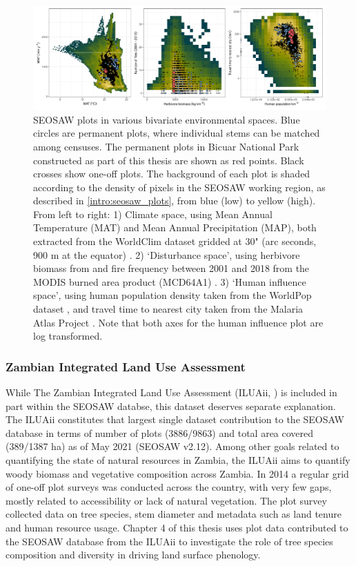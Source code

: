 \begin{refsection}
\begin{figure}[tb]
\centering
	\includegraphics[width=\textwidth]{img/seosaw_space_all}
	\caption[Distribution of SEOSAW plots in environmental space]{SEOSAW plots in various bivariate environmental spaces. Blue circles are permanent plots, where individual stems can be matched among censuses. The permanent plots in Bicuar National Park constructed as part of this thesis are shown as red points. Black crosses show one-off plots. The background of each plot is shaded according to the density of pixels in the SEOSAW working region, as described in \autoref{intro:seosaw_plots}, from blue (low) to yellow (high). From left to right: 1) Climate space, using Mean Annual Temperature (MAT) and Mean Annual Precipitation (MAP), both extracted from the WorldClim dataset gridded at 30" (arc seconds, \textapprox{}900 m at the equator) \citep{Fick2017}. 2) `Disturbance space', using herbivore biomass from \citet{Hempson2017} and fire frequency between 2001 and 2018 from the MODIS burned area product (MCD64A1) \citep{MCD64A1}. 3) `Human influence space', using human population density taken from the WorldPop dataset \citep{Linard2012}, and travel time to nearest city taken from the Malaria Atlas Project \citep{Meijer2018}. Note that both axes for the human influence plot are log transformed.}
	\label{intro:seosaw_space_all}
\end{figure}

\subsubsection{Zambian Integrated Land Use Assessment}
\label{intro:sssec:iluaii}

While The Zambian Integrated Land Use Assessment (ILUAii, \citealt{Mukosha2009}) is included in part within the SEOSAW databse, this dataset deserves separate explanation. The ILUAii constitutes that largest single dataset contribution to the SEOSAW database in terms of number of plots (3886/9863) and total area covered (389/1387 ha) as of May 2021 (SEOSAW v2.12). Among other goals related to quantifying the state of natural resources in Zambia, the ILUAii aims to quantify woody biomass and vegetative composition across Zambia. In 2014 a regular grid of one-off plot surveys was conducted across the country, with very few gaps, mostly related to accessibility or lack of natural vegetation. The plot survey collected data on tree species, stem diameter and metadata such as land tenure and human resource usage. Chapter 4 of this thesis uses plot data contributed to the SEOSAW database from the ILUAii to investigate the role of tree species composition and diversity in driving land surface phenology. 


\end{refsection}
